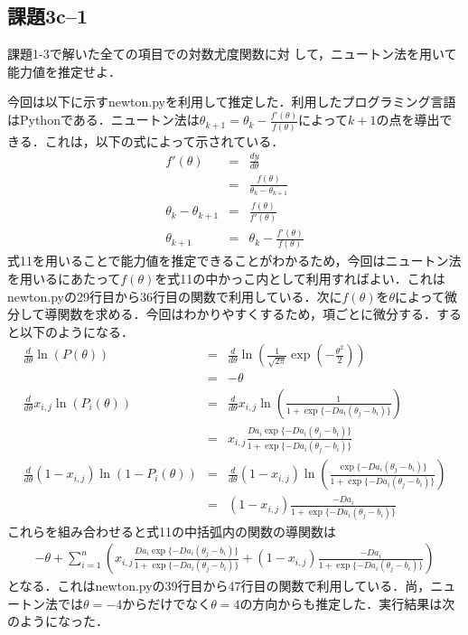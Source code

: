 \documentclass[12pt]{jarticle}
\begin{document}
\subsection{課題3c–1}
\begin{shadebox}
    \quad 課題1-3で解いた全ての項目での対数尤度関数に対
    して，ニュートン法を用いて能力値を推定せよ．
\end{shadebox}
\vspace{\baselineskip}
今回は以下に示すnewton.pyを利用して推定した．利用したプログラミング言語はPythonである．ニュートン法は$\theta_{k+1}=\theta_k-\frac{f'(\theta)}{f(\theta)}$によって$k+1$の点を導出できる．これは，以下の式によって示されている．
\begin{eqnarray*}
    f'(\theta)&=&\frac{dy}{d\theta}\\
    &=&\frac{f(\theta)}{\theta_k-\theta_{k+1}}\\
    \theta_k-\theta_{k+1}&=&\frac{f(\theta)}{f'(\theta)}\\
    \theta_{k+1}&=&\theta_k-\frac{f'(\theta)}{f(\theta)}
\end{eqnarray*}
式11を用いることで能力値を推定できることがわかるため，今回はニュートン法を用いるにあたって$f(\theta)$を式11の中かっこ内として利用すればよい．これはnewton.pyの29行目から36行目の関数で利用している．次に$f(\theta)$を$\theta$によって微分して導関数を求める．今回はわかりやすくするため，項ごとに微分する．すると以下のようになる．
\begin{eqnarray*}
    \frac{d}{d\theta}\ln(P(\theta))&=&\frac{d}{d\theta}\ln\left(\frac{1}{\sqrt{2\pi}}\exp\left(-\frac{\theta^2}{2}\right)\right)\\
    &=&-\theta\\
    \frac{d}{d\theta}x_{i,j}\ln(P_i(\theta))&=&\frac{d}{d\theta}x_{i,j}\ln\left(\frac{1}{1+\exp\{-Da_i(\theta_j -b_i)\}}\right)\\
    &=&x_{i,j}\frac{Da_i\exp\{-Da_i(\theta_j -b_i)\}}{1+\exp\{-Da_i(\theta_j -b_i)\}}\\
    \frac{d}{d\theta}(1-x_{i,j})\ln(1-P_i(\theta))&=&\frac{d}{d\theta}(1-x_{i,j})\ln\left(\frac{\exp\{-Da_i(\theta_j -b_i)\}}{1+\exp\{-Da_i(\theta_j -b_i)\}}\right)\\
    &=&(1-x_{i,j})\frac{-Da_i}{1+\exp\{-Da_i(\theta_j -b_i)\}}
\end{eqnarray*}
これらを組み合わせると式11の中括弧内の関数の導関数は
\begin{eqnarray*}
    -\theta+\sum_{i=1}^n\left({x_{i,j}\frac{Da_i\exp\{-Da_i(\theta_j -b_i)\}}{1+\exp\{-Da_i(\theta_j -b_i)\}}+(1-x_{i,j})\frac{-Da_i}{1+\exp\{-Da_i(\theta_j -b_i)\}}}\right)
\end{eqnarray*}
となる．これはnewton.pyの39行目から47行目の関数で利用している．尚，ニュートン法では$\theta=-4$からだけでなく$\theta=4$の方向からも推定した．実行結果は次のようになった．
\clearpage
\end{document}
